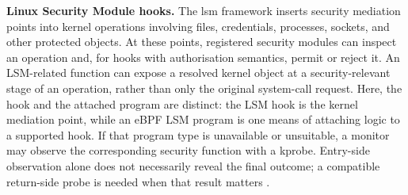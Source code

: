 \medskip
\noindent\textbf{Linux Security Module hooks.}
The \gls{lsm} framework inserts security mediation points into kernel
operations involving files, credentials, processes, sockets, and other
protected objects. At these points, registered security modules can inspect an
operation and, for hooks with authorisation semantics, permit or reject it.
An LSM-related function can expose a resolved kernel object at a
security-relevant stage of an operation, rather than only the original
system-call request. Here, the hook and the attached program are distinct: the
LSM hook is the kernel mediation point, while an eBPF LSM program is one means
of attaching logic to a supported hook. If that program type is unavailable or
unsuitable, a monitor may observe the corresponding security function with a
kprobe. Entry-side observation alone does not necessarily reveal the final
outcome; a compatible return-side probe is needed when that result matters
\cite{linux_lsm_development,linux_libbpf_program_types,linux_kprobes}.

